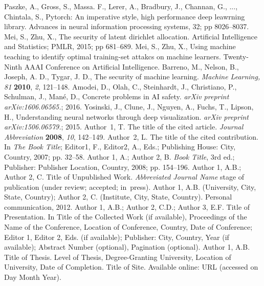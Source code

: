 \documentclass[journal,article,submit,moreauthors,pdftex]{Definitions/mdpi}
\begin{document}
\begin{thebibliography}{999}
Paszke, A., Gross, S., Massa. F., Lerer, A., Bradbury, J., Channan, G., ..., Chintala, S., Pytorch: An imperative style, high performance deep leawrning library. Advances in neural information processing systems, 32; pp 8026--8037.
Mei, S., Zhu, X., The security of latent dirichlet allocation. Artificial Intelligence and Statistics; PMLR, 2015; pp 681--689.
Mei, S., Zhu, X., Using machine teaching to identify optimal training-set attakcs on machine learners. Twenty-Ninth AAAI Conference on Artificial Intelligence.
Barreno, M., Nelson, B., Joseph, A. D., Tygar, J. D.,  The security of machine learning. {\em Machine Learning, 81} {\bf 2010}, {\em 2}, 121--148.
Amodei, D., Olah, C., Steinhardt, J., Christiano, P., Schulman, J., Mané, D., Concrete problems in AI safety. \textit{arXiv preprint arXiv:1606.06565.}; 2016.
Yosinski, J., Clune, J., Nguyen, A., Fuchs, T., Lipson, H., Understanding neural networks through deep visualization. \textit{arXiv preprint arXiv:1506.06579.}; 2015.
Author~1, T. The title of the cited article. {\em Journal Abbreviation} {\bf 2008}, {\em 10}, 142--149.
Author~2, L. The title of the cited contribution. In {\em The Book Title}; Editor1, F., Editor2, A., Eds.; Publishing House: City, Country, 2007; pp. 32--58.
Author 1, A.; Author 2, B. \textit{Book Title}, 3rd ed.; Publisher: Publisher Location, Country, 2008; pp. 154--196.
Author 1, A.B.; Author 2, C. Title of Unpublished Work. \textit{Abbreviated Journal Name} stage of publication (under review; accepted; in~press).
Author 1, A.B. (University, City, State, Country); Author 2, C. (Institute, City, State, Country). Personal communication, 2012.
Author 1, A.B.; Author 2, C.D.; Author 3, E.F. Title of Presentation. In Title of the Collected Work (if available), Proceedings of the Name of the Conference, Location of Conference, Country, Date of Conference; Editor 1, Editor 2, Eds. (if available); Publisher: City, Country, Year (if available); Abstract Number (optional), Pagination (optional).
Author 1, A.B. Title of Thesis. Level of Thesis, Degree-Granting University, Location of University, Date of Completion.
Title of Site. Available online: URL (accessed on Day Month Year).
\end{thebibliography}
\end{document}
